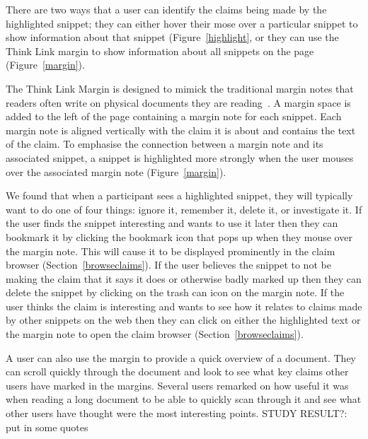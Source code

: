 \documentclass{chi2009}
\newcommand{\todo}[1]{}
\newcommand{\studyresult}[1]{{\color{red} STUDY RESULT?: #1}\\}
\begin{document}
There are two ways that a user can identify the claims being made by the highlighted snippet; they can either hover their mose over a particular snippet to show information about that snippet (Figure~\ref{highlight}, or they can use the Think Link margin to show information about all snippets on the page (Figure~\ref{margin}).

The Think Link Margin is designed to mimick the traditional margin notes that readers often write on physical documents they are reading~\cite{marginalia}. A margin space is added to the left of the page containing a margin note for each snippet. Each margin note is aligned vertically with the claim it is about and contains the text of the claim. To emphasise the connection between a margin note and its associated snippet, a snippet is highlighted more strongly when the user mouses over the associated margin note (Figure~\ref{margin}). 

We found that when a participant sees a highlighted snippet, they will typically want to do one of four things: ignore it, remember it, delete it, or investigate it. If the user finds the snippet interesting and wants to use it later then they can bookmark it by clicking the bookmark icon that pops up when they mouse over the margin note. This will cause it to be displayed prominently in the claim browser (Section~\ref{browseclaims}). If the user believes the snippet to not be making the claim that it says it does or otherwise badly marked up then they can delete the snippet by clicking on the trash can icon on the margin note. If the user thinks the claim is interesting and wants to see how it relates to claims made by other snippets on the web then they can click on either the highlighted text or the margin note to open the claim browser (Section~\ref{browseclaims}).

A user can also use the margin to provide a quick overview of a document. They can scroll quickly through the document and look to see what key claims other users have marked in the margins. Several users remarked on how useful it was when reading a long document to be able to quickly scan through it and see what other users have thought were the most interesting points. \studyresult{put in some quotes}

\todo{sort out more consistent colors and icons between this view and the web view}
\todo{give the margin consistent colors with the highlight sections}
\todo{more nice zoomed-in screenshots showing the different interaction techniques}
\end{document}
